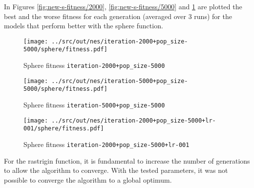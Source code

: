 In Figures \ref{fig:new-s-fitness/2000}, \ref{fig:new-s-fitness/5000} and \ref{fig:new-s-fitness/lr} are plotted the best and the worse fitness for each generation (averaged over 3 runs) for the models that perform better with the sphere function.

 \begin{figure}[H]
	\centering
	\begin{minipage}[b]{.6\textwidth}
		\texttt{[image: ../src/out/nes/iteration-2000+pop\_size-5000/sphere/fitness.pdf]}	
	\end{minipage}
	\caption{Sphere fitness \texttt{iteration-2000+pop\_size-5000}}
	\label{fig:new-s-fitness/2000}
	
	\begin{minipage}[b]{.6\textwidth}
		\texttt{[image: ../src/out/nes/iteration-5000+pop\_size-5000/sphere/fitness.pdf]}	
	\end{minipage}
	\caption{Sphere fitness \texttt{iteration-5000+pop\_size-5000}}
	\label{fig:new-s-fitness/5000}

	\begin{minipage}[b]{.6\textwidth}
		\texttt{[image: ../src/out/nes/iteration-2000+pop\_size-5000+lr-001/sphere/fitness.pdf]}	
	\end{minipage}
	\caption{Sphere fitness \texttt{iteration-2000+pop\_size-5000+lr-001}}
	\label{fig:new-s-fitness/lr}
\end{figure}

For the rastrigin function, it is fundamental to increase the number of generations to allow the algorithm to converge.
With the tested parameters, it was not possible to converge the algorithm to a global optimum.

